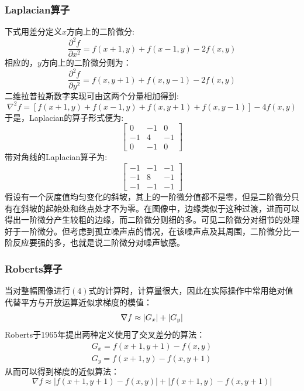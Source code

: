 \documentclass[]{IEEEphot}
\begin{document}
\subsubsection{Laplacian算子}
下式用差分定义$x$方向上的二阶微分:
\begin{equation}
	\frac{\partial^2f}{\partial x^2}=f(x+1,y)+f(x-1,y)-2f(x,y)
	\label{eql}
\end{equation}
相应的，$y$方向上的二阶微分则为：
\begin{equation}
	\frac{\partial^2f}{\partial y^2}=f(x,y+1)+f(x,y-1)-2f(x,y)
	\label{eql}
\end{equation}
二维拉普拉斯数字实现可由这两个分量相加得到:
\begin{equation}
	\nabla^2f=[f(x+1,y)+f(x-1,y)+f(x,y+1)+f(x,y-1)]-4f(x,y)
	\label{eql}
\end{equation}
于是，Laplacian的算子形式便为:
\[
	\left[
		\begin{array}{lcr}
			0 & -1 & 0 \\
		-1 & 4 & -1 \\
			0 & -1 & 0 
		\end{array}
	\right]
\]
带对角线的Laplacian算子为:
\[
	\left[
		\begin{array}{lcr}
			-1 & -1 & -1 \\
			-1 &  8 & -1 \\
			-1 & -1 & -1
		\end{array}
	\right]
\]
假设有一个灰度值均匀变化的斜坡，其上的一阶微分值都不是零，但是二阶微分只有在斜坡的起始处和终点处才不为零。在图像中，边缘类似于这种过渡，进而可以得出一阶微分产生较粗的边缘，而二阶微分则细的多。可见二阶微分对细节的处理好于一阶微分。但考虑到孤立噪声点的情况，在该噪声点及其周围，二阶微分比一阶反应要强的多，也就是说二阶微分对噪声敏感。
\subsubsection{Roberts算子}
当对整幅图像进行$(4)$式的计算时，计算量很大，因此在实际操作中常用绝对值代替平方与开放运算近似求梯度的模值：
\begin{equation}
	\nabla f\approx |G_x|+|G_y|\\
	\label{eql}
\end{equation}
Roberts于1965年提出两种定义使用了交叉差分的算法：
\begin{eqnarray}
	G_x=f(x+1,y+1)-f(x,y)\\
	G_y=f(x+1,y)-f(x,y+1)
\end{eqnarray} 从而可以得到梯度的近似算法： 
\begin{equation} 
	\nabla f\approx |f(x+1,y+1)-f(x,y)|+|f(x+1,y)-f(x,y+1)| \label{eql}
\end{equation}
\end{document}
